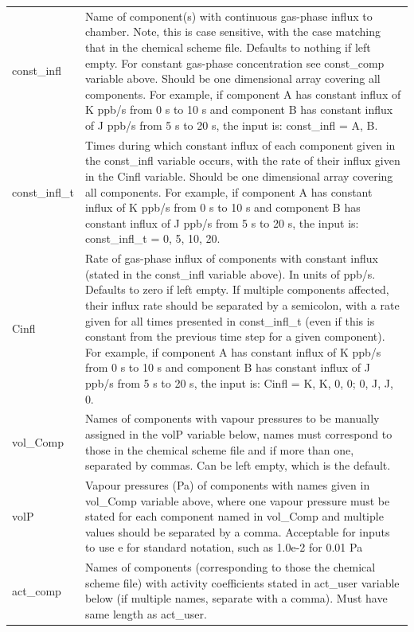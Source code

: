 \documentclass[gmd, manuscript]{copernicus}
\begin{document}
\begin{center}
\begin{supertabular}{p{0.15\textwidth}p{0.75\textwidth}}
const\_infl & Name of component(s) with continuous gas-phase influx to chamber. Note, this is case sensitive, with the case matching that in the chemical scheme file. Defaults to nothing if left empty. For constant gas-phase concentration see const\_comp variable above. Should be one dimensional array covering all components. For example, if component A has constant influx of K ppb/s from 0 s to 10 s and component B has constant influx of J ppb/s from 5 s to 20 s, the input is: const\_infl = A, B.\\

const\_infl\_t & Times during which constant influx of each component given in the const\_infl variable occurs, with the rate of their influx given in the Cinfl variable.  Should be one dimensional array covering all components.  For example, if component A has constant influx of K ppb/s from 0 s to 10 s and component B has constant influx of J ppb/s from 5 s to 20 s, the input is: const\_infl\_t = 0, 5, 10, 20.\\

Cinfl & Rate of gas-phase influx of components with constant influx (stated in the const\_infl variable above).  In units of ppb/s.  Defaults to zero if left empty.  If multiple components affected, their influx rate should be separated by a semicolon, with a rate given for all times presented in const\_infl\_t (even if this is constant from the previous time step for a given component).  For example, if component A has constant influx of K ppb/s from 0 s to 10 s and component B has constant influx of J ppb/s from 5 s to 20 s, the input is: Cinfl = K, K, 0, 0; 0, J, J, 0.\\

vol\_Comp & Names of components with vapour pressures to be manually assigned in the volP variable below, names must correspond to those in the chemical scheme file and if more than one, separated by commas.  Can be left empty, which is the default.\\

volP & Vapour pressures (Pa) of components with names given in vol\_Comp variable above, where one vapour pressure must be stated for each component named in vol\_Comp and multiple values should be separated by a comma.  Acceptable for inputs to use e for standard notation, such as 1.0e-2 for 0.01 Pa\\

act\_comp & Names of components (corresponding to those the chemical scheme file) with activity coefficients stated in act\_user variable below (if multiple names, separate with a comma).  Must have same length as act\_user.\\


\end{supertabular}
\end{center}
\end{document}
